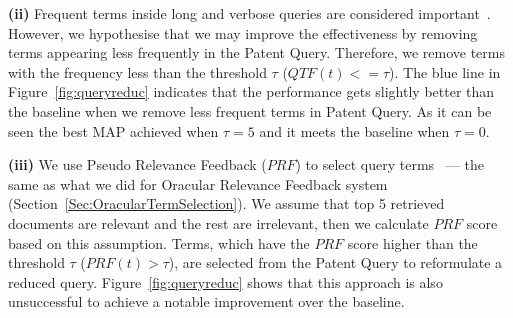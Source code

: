 \vspace*{0.5mm}
\noindent \textbf{(ii)} Frequent terms inside long and verbose queries are considered important~\cite{maxwell2013compact}. However, we hypothesise that we may improve the effectiveness by removing terms appearing less frequently in the Patent Query. Therefore, we remove terms with the frequency less than the threshold $\tau$ ($QTF(t)<=\tau$). The blue line in Figure~\ref{fig:queryreduc} indicates that the performance gets slightly better than the baseline when we remove less frequent terms in Patent Query. As it can be seen the best MAP achieved when $\tau=5$ and it meets the baseline when $\tau=0$. 

\vspace*{0.5mm}
\noindent \textbf{(iii)} We use Pseudo Relevance Feedback ($\mathit{PRF}$) to select query terms~\cite{maxwell2013compact} --- the same as what we did for Oracular Relevance Feedback system (Section~\ref{Sec:OracularTermSelection}). We assume that top 5 retrieved documents are relevant and the rest are irrelevant, then we calculate $\mathit{PRF}$ score based on this assumption.  
Terms, which have the $\mathit{PRF}$ score higher than the threshold $\tau$ ($PRF(t)>\tau$), are selected from the Patent Query to reformulate a reduced query. Figure~\ref{fig:queryreduc} shows that this approach is also unsuccessful to achieve a notable improvement over the baseline.


